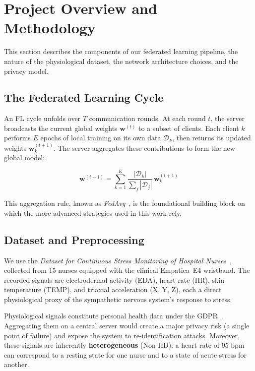 \documentclass{article}
\begin{document}
\section{Project Overview and Methodology}
\label{sec:methodology}

This section describes the components of our federated learning pipeline, the
nature of the physiological dataset, the network architecture choices, and the
privacy model.

\subsection{The Federated Learning Cycle}
\label{subsec:fl_cycle}

An FL cycle unfolds over $T$ communication rounds. At each round $t$, the server
broadcasts the current global weights $\mathbf{w}^{(t)}$ to a subset of clients.
Each client $k$ performs $E$ epochs of local training on its own data
$\mathcal{D}_k$, then returns its updated weights $\mathbf{w}_k^{(t+1)}$. The server
aggregates these contributions to form the new global model:

\begin{equation}
  \mathbf{w}^{(t+1)} = \sum_{k=1}^{K} \frac{|\mathcal{D}_k|}{\sum_j |\mathcal{D}_j|}
  \, \mathbf{w}_k^{(t+1)}
  \label{eq:fedavg}
\end{equation}

This aggregation rule, known as \textit{FedAvg}~\cite{mcmahan2017communication}, is
the foundational building block on which the more advanced strategies used in this
work rely.

\subsection{Dataset and Preprocessing}
\label{subsec:dataset}

We use the \textit{Dataset for Continuous Stress Monitoring of Hospital
Nurses}~\cite{nurse_stress_dataset}, collected from 15 nurses equipped with the
clinical Empatica~E4 wristband. The recorded signals are electrodermal activity
(EDA), heart rate (HR), skin temperature (TEMP), and triaxial acceleration (X, Y,
Z), each a direct physiological proxy of the sympathetic nervous system's response
to stress.

Physiological signals constitute personal health data under the
GDPR~\cite{gdpr2016}. Aggregating them on a central server would create a major
privacy risk (a single point of failure) and expose the system to re-identification
attacks. Moreover, these signals are inherently \textbf{heterogeneous} (Non-IID): a
heart rate of 95 bpm can correspond to a resting state for one nurse and to a state
of acute stress for another.
\end{document}
